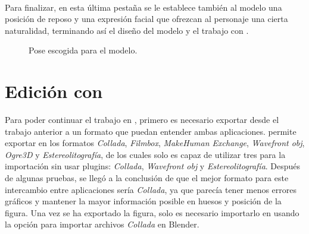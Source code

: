 \documentclass{subfiles}
\begin{document}
    \paragraph{}
    Para finalizar, en esta última pestaña se le establece también al modelo una posición de reposo y una expresión facial que ofrezcan al personaje una cierta naturalidad, terminando así el diseño del modelo y el trabajo con \makehuman.
    
    \begin{figure}[H]
    \centering
    \caption{Pose escogida para el modelo.}
    \label{fig:4.1.model_pose}
    \end{figure}
    
    \section{Edición con \blender}
    \label{sec:4.2}

    Para poder continuar el trabajo en \blender, primero es necesario exportar desde \makehuman el trabajo anterior a un formato que puedan entender ambas aplicaciones. \makehuman permite exportar en los formatos \textit{Collada}, \textit{Filmbox}, \textit{MakeHuman Exchange}, \textit{Wavefront obj}, \textit{Ogre3D} y \textit{Estereolitografía}, de los cuales \blender solo es capaz de utilizar tres para la importación sin usar plugins: \textit{Collada}, \textit{Wavefront obj} y \textit{Estereolitografía}. Después de algunas pruebas, se llegó a la conclusión de que el mejor formato para este intercambio entre aplicaciones sería \textit{Collada}, ya que parecía tener menos errores gráficos y mantener la mayor información posible en huesos y posición de la figura. Una vez se ha exportado la figura, solo es necesario importarlo en \blender usando la opción para importar archivos \textit{Collada} en Blender.
\end{document}
